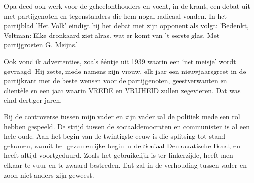 \documentclass[12pt,twoside, openright]{memoir}
\begin{document}

Opa deed ook werk voor de geheelonthouders en vocht, in de krant, een debat uit met partijgenoten en tegenstanders die hem nogal radicaal vonden. In het partijblad 'Het Volk' eindigt hij het debat met zijn opponent als volgt: 'Bedenkt, Veltman: Elke dronkaard ziet alras. wat er komt van 't eerste glas. Met partijgroeten G. Meijns.'

Ook vond ik advertenties, zoals ééntje uit 1939 waarin een `net meisje' wordt gevraagd. Hij zette, mede namens zijn vrouw, elk jaar een nieuwjaarsgroet in de partijkrant met de beste wensen voor de partijgenoten, geestverwanten en clientèle en een jaar waarin VREDE en VRIJHEID zullen zegevieren. Dat was eind dertiger jaren.









Bij de controverse tussen mijn vader en zijn vader zal de politiek mede een rol hebben gespeeld. De strijd tussen de sociaaldemocraten en communisten is al een hele oude. Aan het begin van de twintigste eeuw is die splitsing tot stand gekomen, vanuit het gezamenlijke begin in de Sociaal Democratische Bond, en heeft altijd voortgeduurd. Zoals het gebruikelijk is ter linkerzijde, heeft men elkaar te vuur en te zwaard bestreden. Dat zal in de verhouding tussen vader en zoon niet anders zijn geweest. 
\end{document}
